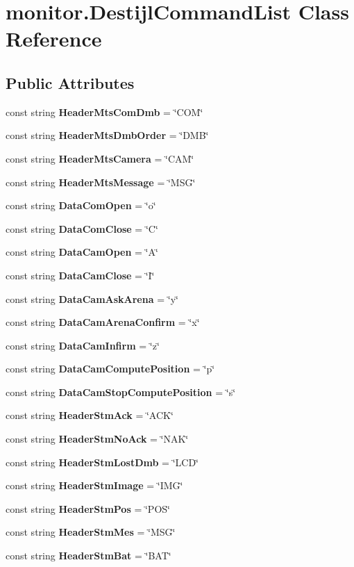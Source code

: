 \section{monitor.\+Destijl\+Command\+List Class Reference}
\label{classmonitor_1_1_destijl_command_list}
\subsection*{Public Attributes}
\begin{DoxyCompactItemize}
\item 
const string \textbf{ Header\+Mts\+Com\+Dmb} = \char`\"{}C\+OM\char`\"{}
\item 
const string \textbf{ Header\+Mts\+Dmb\+Order} = \char`\"{}D\+MB\char`\"{}
\item 
const string \textbf{ Header\+Mts\+Camera} = \char`\"{}C\+AM\char`\"{}
\item 
const string \textbf{ Header\+Mts\+Message} = \char`\"{}M\+SG\char`\"{}
\item 
const string \textbf{ Data\+Com\+Open} = \char`\"{}o\char`\"{}
\item 
const string \textbf{ Data\+Com\+Close} = \char`\"{}C\char`\"{}
\item 
const string \textbf{ Data\+Cam\+Open} = \char`\"{}A\char`\"{}
\item 
const string \textbf{ Data\+Cam\+Close} = \char`\"{}I\char`\"{}
\item 
const string \textbf{ Data\+Cam\+Ask\+Arena} = \char`\"{}y\char`\"{}
\item 
const string \textbf{ Data\+Cam\+Arena\+Confirm} = \char`\"{}x\char`\"{}
\item 
const string \textbf{ Data\+Cam\+Infirm} = \char`\"{}z\char`\"{}
\item 
const string \textbf{ Data\+Cam\+Compute\+Position} = \char`\"{}p\char`\"{}
\item 
const string \textbf{ Data\+Cam\+Stop\+Compute\+Position} = \char`\"{}s\char`\"{}
\item 
const string \textbf{ Header\+Stm\+Ack} = \char`\"{}A\+CK\char`\"{}
\item 
const string \textbf{ Header\+Stm\+No\+Ack} = \char`\"{}N\+AK\char`\"{}
\item 
const string \textbf{ Header\+Stm\+Lost\+Dmb} = \char`\"{}L\+CD\char`\"{}
\item 
const string \textbf{ Header\+Stm\+Image} = \char`\"{}I\+MG\char`\"{}
\item 
const string \textbf{ Header\+Stm\+Pos} = \char`\"{}P\+OS\char`\"{}
\item 
const string \textbf{ Header\+Stm\+Mes} = \char`\"{}M\+SG\char`\"{}
\item 
const string \textbf{ Header\+Stm\+Bat} = \char`\"{}B\+AT\char`\"{}
\end{DoxyCompactItemize}


